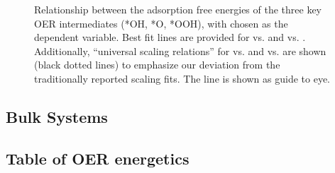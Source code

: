 \begin{figure}[!htb]
\centering
\caption{\label{fig:scaling_relations}
Relationship between the adsorption free energies of the three key OER intermediates (*OH, *O, *OOH), with \DGOH chosen as the dependent variable.
%
Best fit lines are provided for \DGOOH vs. \DGOH and \DGO vs. \DGOH.
%
Additionally, ``universal scaling relations'' for \DGOOH vs. \DGOH and \DGO vs. \DGOH are shown (black dotted lines) to emphasize our deviation from the traditionally reported scaling fits.
%
The \DGOH line is  shown as guide to eye.
}
\end{figure}



\subsection{Bulk Systems}  %
%



\subsection{Table of OER energetics}  %
%

